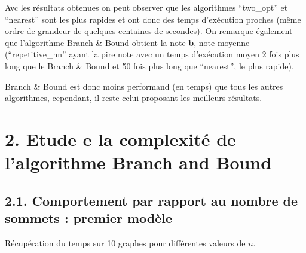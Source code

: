 \documentclass[
]{article}
\newenvironment{Shaded}{\begin{snugshade}}{\end{snugshade}}
\newcommand{\CommentTok}[1]{\textcolor[rgb]{0.56,0.35,0.01}{\textit{#1}}}
\newcommand{\ControlFlowTok}[1]{\textcolor[rgb]{0.13,0.29,0.53}{\textbf{#1}}}
\newcommand{\DataTypeTok}[1]{\textcolor[rgb]{0.13,0.29,0.53}{#1}}
\newcommand{\DecValTok}[1]{\textcolor[rgb]{0.00,0.00,0.81}{#1}}
\newcommand{\KeywordTok}[1]{\textcolor[rgb]{0.13,0.29,0.53}{\textbf{#1}}}
\newcommand{\NormalTok}[1]{#1}
\newcommand{\OperatorTok}[1]{\textcolor[rgb]{0.81,0.36,0.00}{\textbf{#1}}}
\newcommand{\StringTok}[1]{\textcolor[rgb]{0.31,0.60,0.02}{#1}}
\begin{document}
Avc les résultats obtenues on peut observer que les algorithmes
``two\_opt'' et ``nearest'' sont les plus rapides et ont donc des temps
d'exécution proches (même ordre de grandeur de quelques centaines de
secondes). On remarque également que l'algorithme Branch \& Bound
obtient la note \textbf{b}, note moyenne (``repetitive\_nn'' ayant la
pire note avec un temps d'exécution moyen 2 fois plus long que le Branch
\& Bound et 50 fois plus long que ``nearest'', le plus rapide).

Branch \& Bound est donc moins performand (en temps) que tous les autres
algorithmes, cependant, il reste celui proposant les meilleurs
résultats.

\hypertarget{etude-e-la-complexituxe9-de-lalgorithme-branch-and-bound}{%
\section{2. Etude e la complexité de l'algorithme Branch and
Bound}\label{etude-e-la-complexituxe9-de-lalgorithme-branch-and-bound}}

\hypertarget{comportement-par-rapport-au-nombre-de-sommets-premier-moduxe8le}{%
\subsection{2.1. Comportement par rapport au nombre de sommets : premier
modèle}\label{comportement-par-rapport-au-nombre-de-sommets-premier-moduxe8le}}

Récupération du temps sur 10 graphes pour différentes valeurs de \(n\).

\begin{Shaded}
\end{Shaded}
\end{document}
